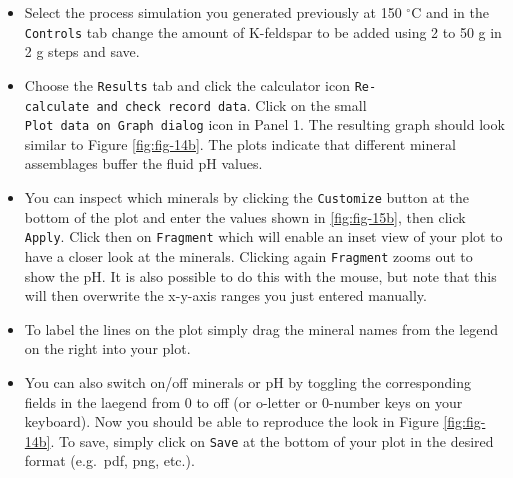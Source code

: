 \documentclass[
]{book}
\begin{document}
\begin{itemize}
\item
  Select the process simulation you generated previously at 150 \(^\circ\)C and in the \texttt{Controls} tab change the amount of K-feldspar to be added using 2 to 50 g in 2 g steps and save.
\item
  Choose the \texttt{Results} tab and click the calculator icon \texttt{Re-calculate\ and\ check\ record\ data}. Click on the small \texttt{Plot\ data\ on\ Graph\ dialog} icon in Panel 1. The resulting graph should look similar to Figure \ref{fig:fig-14b}. The plots indicate that different mineral assemblages buffer the fluid pH values.
\item
  You can inspect which minerals by clicking the \texttt{Customize} button at the bottom of the plot and enter the values shown in \ref{fig:fig-15b}, then click \texttt{Apply}. Click then on \texttt{Fragment} which will enable an inset view of your plot to have a closer look at the minerals. Clicking again \texttt{Fragment} zooms out to show the pH. It is also possible to do this with the mouse, but note that this will then overwrite the x-y-axis ranges you just entered manually.
\item
  To label the lines on the plot simply drag the mineral names from the legend on the right into your plot.
\item
  You can also switch on/off minerals or pH by toggling the corresponding fields in the laegend from 0 to off (or o-letter or 0-number keys on your keyboard). Now you should be able to reproduce the look in Figure \ref{fig:fig-14b}. To save, simply click on \texttt{Save} at the bottom of your plot in the desired format (e.g.~pdf, png, etc.).
\end{itemize}
\end{document}
